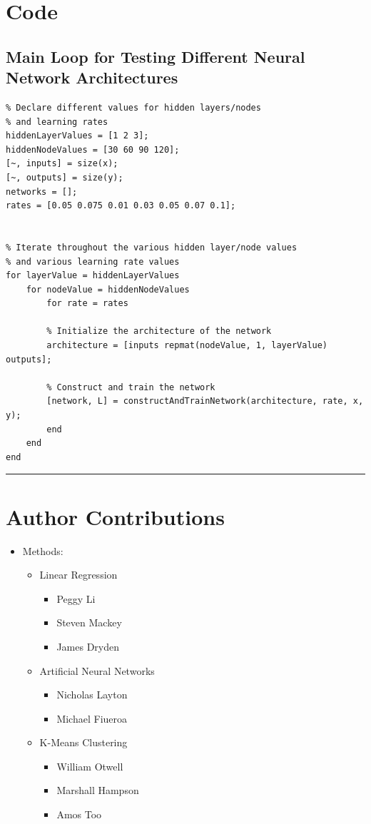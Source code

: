 \documentclass[12pt]{article}
\newcommand{\horizontalLine}{
	\begin{center}
		\hrule width 1.0\textwidth
	\end{center}
}
\begin{document}
\section{Code}
\label{sec:code}

\subsection{Main Loop for Testing Different Neural Network Architectures}
\label{subsec:annLoop}
\begin{lstlisting}
% Declare different values for hidden layers/nodes
% and learning rates
hiddenLayerValues = [1 2 3];
hiddenNodeValues = [30 60 90 120];
[~, inputs] = size(x);
[~, outputs] = size(y);
networks = [];
rates = [0.05 0.075 0.01 0.03 0.05 0.07 0.1];


% Iterate throughout the various hidden layer/node values
% and various learning rate values
for layerValue = hiddenLayerValues
    for nodeValue = hiddenNodeValues
        for rate = rates
        
        % Initialize the architecture of the network
        architecture = [inputs repmat(nodeValue, 1, layerValue) outputs];
        
        % Construct and train the network
        [network, L] = constructAndTrainNetwork(architecture, rate, x, y);
        end
    end
end
\end{lstlisting}

\horizontalLine
\section{Author Contributions}
\label{sec:authorContributions}
\begin{itemize}
    \item Methods:
    \begin{itemize}
        \item Linear Regression
        \begin{itemize}
            \item Peggy Li
            \item Steven Mackey
            \item James Dryden
        \end{itemize}
        \item Artificial Neural Networks
        \begin{itemize}
            \item Nicholas Layton
            \item Michael Fiueroa
        \end{itemize}
        \item K-Means Clustering
        \begin{itemize}
            \item William Otwell
            \item Marshall Hampson
            \item Amos Too
        \end{itemize}
    \end{itemize}
\end{itemize}
\end{document}
